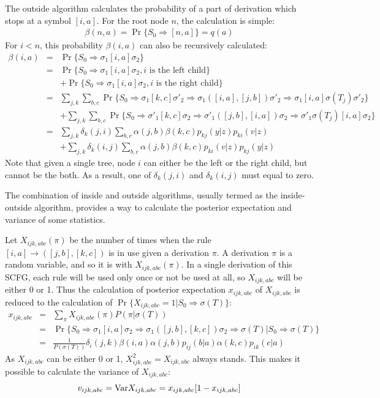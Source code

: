\documentclass[pdftex,11pt]{article}
\begin{document}
The outside algorithm calculates the probability of a part of derivation
which stops at a symbol $[i,a]$. For the root node $n$, the calculation
is simple:
\begin{eqnarray}
\beta(n,a)=\Pr\{S_0\Rightarrow[n,a]\}=q(a)
\end{eqnarray}
For $i<n$, this probability $\beta(i,a)$ can also be recursively calculated:
\begin{eqnarray}\label{equ:out}
  \beta(i,a)&=&\Pr\{S_0\Rightarrow\sigma_1[i,a]\sigma_2\}\nonumber\\
  &=&\Pr\{S_0\Rightarrow\sigma_1[i,a]\sigma_2,\mbox{$i$ is the left child}\}\nonumber\\
  &&+\Pr\{S_0\Rightarrow\sigma_1[i,a]\sigma_2,\mbox{$i$ is the right child}\}\nonumber\\
  &=&\sum_{j,k}\sum_{b,c}\Pr\{S_0\Rightarrow\sigma_1[k,c]\sigma'_2\Rightarrow\sigma_1([i,a],[j,b])\sigma'_2\Rightarrow\sigma_1[i,a]\sigma(T_j)\sigma'_2\}\nonumber\\
  &&+\sum_{j,k}\sum_{b,c}\Pr\{S_0\Rightarrow\sigma'_1[k,c]\sigma_2\Rightarrow\sigma'_1([j,b],[i,a])\sigma_2\Rightarrow\sigma'_1\sigma(T_j)[i,a]\sigma_2\}\nonumber\\
  &=&\sum_{j,k}\delta_k(j,i)\sum_{b,c}{\alpha(j,b)\beta(k,c)p_{kj}(y|z)p_{ki}(v|z)} \nonumber \\
  &&+\sum_{j,k}\delta_k(i,j)\sum_{b,c}{\alpha(j,b)\beta(k,c)p_{ki}(v|z)p_{kj}(y|z)}
\end{eqnarray}
Note that given a single tree, node $i$ can either be the left or the
right child, but cannot be the both.  As a result, one of
$\delta_k(j,i)$ and $\delta_k(i,j)$ must equal to zero.

The combination of inside and outside algorithms, usually termed as the
inside-outside algorithm, provides a way to calculate the posterior
expectation and variance of some statistics.

Let $X_{ijk,abc}(\pi)$ be the number of times when the rule
$[i,a]\rightarrow([j,b],[k,c])$ is in use given a derivation $\pi$. A
derivation $\pi$ is a random variable, and so it is with
$X_{ijk,abc}(\pi)$.  In a single derivation of this SCFG, each rule will
be used only once or not be used at all, so $X_{ijk,abc}$ will be either
0 or 1. Thus the calculation of posterior expectation $x_{ijk,abc}$ of
$X_{ijk,abc}$ is reduced to the calculation of
$\Pr\{X_{ijk,abc}=1|S_0\Rightarrow\sigma(T)\}$:
\begin{eqnarray}\label{equ:c1}
  x_{ijk,abc}&=&\sum_{\pi}X_{ijk,abc}(\pi)P(\pi|\sigma(T))\nonumber\\
  &=&\Pr\{S_0\Rightarrow\sigma_1[i,a]\sigma_2\Rightarrow\sigma_1([j,b],[k,c])\sigma_2\Rightarrow\sigma(T)|S_0\Rightarrow\sigma(T)\} \nonumber\\
  &=&\frac{1}{P(\sigma(T))}\delta_i(j,k)\beta(i,a)\alpha(j,b)p_{ij}(b|a)\alpha(k,c)p_{ik}(c|a)
\end{eqnarray}
As $X_{ijk,abc}$ can be either 0 or 1, $X^2_{ijk,abc}=X_{ijk,abc}$
always stands. This makes it possible to calculate the variance of
$X_{ijk,abc}$:
\begin{equation}
v_{ijk,abc}={\rm Var}X_{ijk,abc}=x_{ijk,abc}[1-x_{ijk,abc}]
\end{equation}
\end{document}

